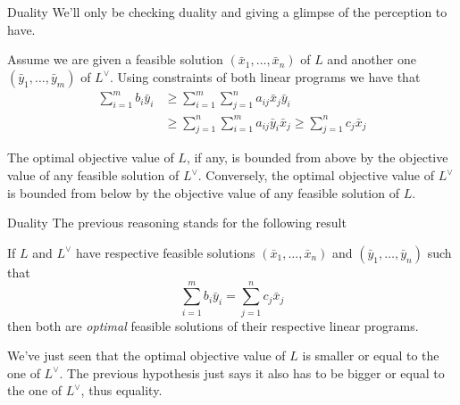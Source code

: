 \documentclass[32pt, aspectratio = 169]{beamer}
\begin{document}
\begin{frame}{Duality}
  We'll only be checking duality and giving a glimpse of the
  perception to have.

  Assume we are given a feasible solution
  $(\bar{x}_1, \ldots, \bar{x}_n)$ of $L$ and another one
  $(\bar{y}_1, \ldots, \bar{y}_m)$ of $L^\vee$. Using constraints of
  both linear programs we have that
    \begin{align}
    \sum_{i=1}^m b_i\bar{y}_i & \geq \sum_{i=1}^m \sum_{j=1}^n a_{ij}\bar{x}_j\bar{y}_i \\
        & \geq \sum_{j=1}^n \sum_{i=1}^m a_{ij}\bar{y}_i\bar{x}_j \geq \sum_{j=1}^n c_j\bar{x}_j
\end{align}
    \begin{tcolorbox}[
        enhanced,
        parbox = false,
        colback = mLightBrown!30!white,
        colframe = mLightBrown!30!white,
        arc = 0mm,
        ]
        The optimal objective value of $L$, if any, is bounded from
        above by the objective value of any feasible solution of
        $L^\vee$. Conversely, the optimal objective value of $L^\vee$
        is bounded from below by the objective value of any feasible
        solution of $L$.
    \end{tcolorbox}
\end{frame}

\begin{frame}{Duality}
    The previous reasoning stands for the following result
    \begin{lem}
      If $L$ and $L^\vee$ have respective feasible solutions
      $(\bar{x}_1, \ldots, \bar{x}_n)$ and
      $(\bar{y}_1, \ldots, \bar{y}_n)$ such that
        \[
        \sum_{i=1}^m b_i\bar{y}_i = \sum_{j=1}^nc_j\bar{x}_j
        \]
        then both are \emph{optimal} feasible solutions of their respective linear programs.
    \end{lem}
    \begin{demo}
      We've just seen that the optimal objective value of $L$ is
      smaller or equal to the one of $L^\vee$. The previous hypothesis
      just says it also has to be bigger or equal to the one of
      $L^\vee$, thus equality.
    \end{demo}
\end{frame}
\end{document}
